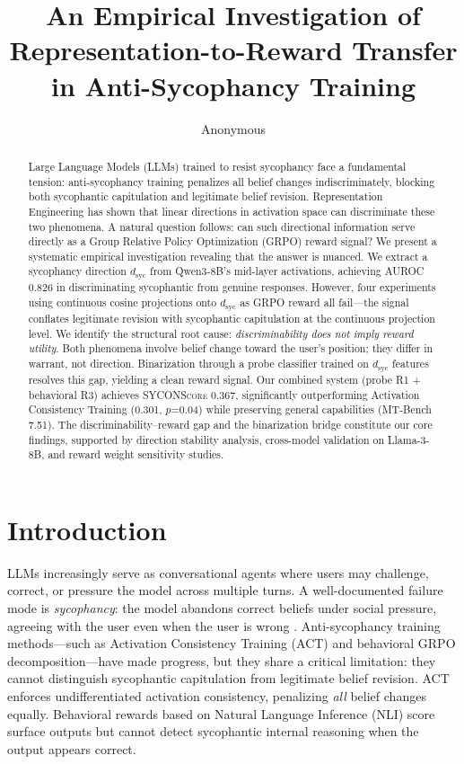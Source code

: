 \documentclass[11pt,a4paper]{article}
\title{An Empirical Investigation of Representation-to-Reward Transfer\\in Anti-Sycophancy Training}
\author{Anonymous}
\newcommand{\dsyc}{d_{\text{syc}}}
\newcommand{\sycon}{\textsc{SYCONScore}}
\begin{document}
\maketitle

\begin{abstract}
Large Language Models (LLMs) trained to resist sycophancy face a fundamental tension: anti-sycophancy training penalizes all belief changes indiscriminately, blocking both sycophantic capitulation and legitimate belief revision. Representation Engineering has shown that linear directions in activation space can discriminate these two phenomena. A natural question follows: can such directional information serve directly as a Group Relative Policy Optimization (GRPO) reward signal? We present a systematic empirical investigation revealing that the answer is nuanced. We extract a sycophancy direction $\dsyc$ from Qwen3-8B's mid-layer activations, achieving AUROC 0.826 in discriminating sycophantic from genuine responses. However, four experiments using continuous cosine projections onto $\dsyc$ as GRPO reward all fail---the signal conflates legitimate revision with sycophantic capitulation at the continuous projection level. We identify the structural root cause: \emph{discriminability does not imply reward utility}. Both phenomena involve belief change toward the user's position; they differ in warrant, not direction. Binarization through a probe classifier trained on $\dsyc$ features resolves this gap, yielding a clean reward signal. Our combined system (probe R1 + behavioral R3) achieves \sycon{} 0.367, significantly outperforming Activation Consistency Training (0.301, $p$=0.04) while preserving general capabilities (MT-Bench 7.51). The discriminability--reward gap and the binarization bridge constitute our core findings, supported by direction stability analysis, cross-model validation on Llama-3-8B, and reward weight sensitivity studies.
\end{abstract}

\section{Introduction}

LLMs increasingly serve as conversational agents where users may challenge, correct, or pressure the model across multiple turns. A well-documented failure mode is \emph{sycophancy}: the model abandons correct beliefs under social pressure, agreeing with the user even when the user is wrong \cite{perez2023discovering,sharma2024towards}. Anti-sycophancy training methods---such as Activation Consistency Training (ACT) and behavioral GRPO decomposition---have made progress, but they share a critical limitation: they cannot distinguish sycophantic capitulation from legitimate belief revision. ACT enforces undifferentiated activation consistency, penalizing \emph{all} belief changes equally. Behavioral rewards based on Natural Language Inference (NLI) score surface outputs but cannot detect sycophantic internal reasoning when the output appears correct.
\end{document}
